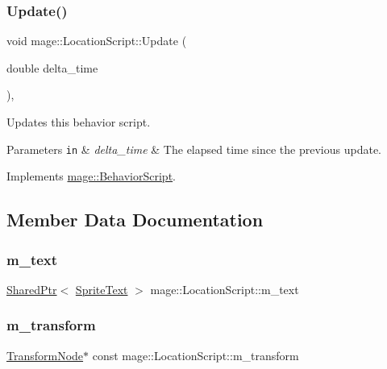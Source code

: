 \subsubsection{\texorpdfstring{Update()}{Update()}}
{\footnotesize\ttfamily void mage\+::\+Location\+Script\+::\+Update (\begin{DoxyParamCaption}\item[{double}]{delta\+\_\+time }\end{DoxyParamCaption})\hspace{0.3cm}{\ttfamily [override]}, {\ttfamily [virtual]}}

Updates this behavior script.


\begin{DoxyParams}[1]{Parameters}
\mbox{\tt in}  & {\em delta\+\_\+time} & The elapsed time since the previous update. \\
\hline
\end{DoxyParams}


Implements \hyperlink{classmage_1_1_behavior_script_a905b6c83640cb91d19fecab3435f6feb}{mage\+::\+Behavior\+Script}.



\subsection{Member Data Documentation}
\hypertarget{classmage_1_1_location_script_ac5c7ada3b364d85888686abf20cd6463}{}\label{classmage_1_1_location_script_ac5c7ada3b364d85888686abf20cd6463} 
\subsubsection{\texorpdfstring{m\+\_\+text}{m\_text}}
{\footnotesize\ttfamily \hyperlink{namespacemage_a1e01ae66713838a7a67d30e44c67703e}{Shared\+Ptr}$<$ \hyperlink{classmage_1_1_sprite_text}{Sprite\+Text} $>$ mage\+::\+Location\+Script\+::m\+\_\+text\hspace{0.3cm}{\ttfamily [private]}}

\hypertarget{classmage_1_1_location_script_a6e4ed33a4d2031c8726731c64b8200c9}{}\label{classmage_1_1_location_script_a6e4ed33a4d2031c8726731c64b8200c9} 
\subsubsection{\texorpdfstring{m\+\_\+transform}{m\_transform}}
{\footnotesize\ttfamily \hyperlink{classmage_1_1_transform_node}{Transform\+Node}$\ast$ const mage\+::\+Location\+Script\+::m\+\_\+transform\hspace{0.3cm}{\ttfamily [private]}}


